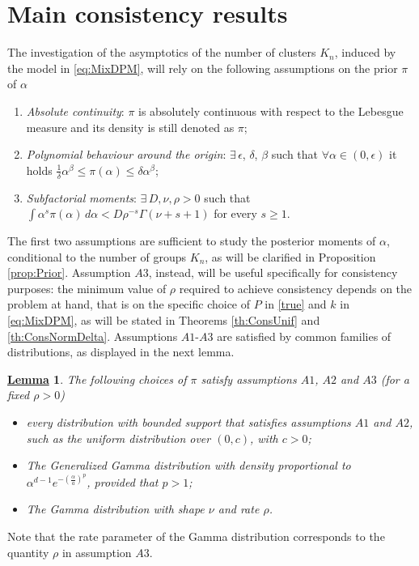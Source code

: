 \documentclass[12pt]{article}
\newtheorem{Lem}{\underline{\bf Lemma}}
\begin{document}
\section{Main consistency results}\label{sec:consistency_results}
The investigation of the asymptotics of the number of clusters $K_n$, induced by the model in \eqref{eq:MixDPM}, will rely on the following assumptions on the prior $\pi$ of $\alpha$
\begin{enumerate}
\item[$A1.$] \emph{Absolute continuity}: $\pi$ is absolutely continuous with respect to the Lebesgue measure and its density is still denoted as $\pi$;
\item[$A2.$] \emph{Polynomial behaviour around the origin}: $\exists \, \epsilon $, $\delta$, $\beta$ such that $\forall \alpha \in (0, \epsilon)$ it holds $\frac{1}{\delta}\alpha^\beta \leq \pi(\alpha) \leq \delta \alpha^\beta$;
\item[$A3.$] \emph{Subfactorial moments}: $ \exists \, D, \nu, \rho > 0$ such that $\int \alpha^s \pi(\alpha) \, d\alpha < D\rho^{-s}\Gamma(\nu+s+1)$ for every $s\ge 1$. 
\end{enumerate}
The first two assumptions are sufficient to study the posterior moments of $\alpha$, conditional to the number of groups $K_n$, as will be clarified in Proposition \ref{prop:Prior}. Assumption $A3$, instead, will be useful specifically for consistency purposes: the minimum value of $\rho$ %
required to achieve consistency depends on the problem at hand, that is on the specific choice of $P$ in \eqref{true} and $k$ in \eqref{eq:MixDPM}, as will be stated in Theorems \ref{th:ConsUnif} and \ref{th:ConsNormDelta}. Assumptions $A1$-$A3$ are satisfied by common families of distributions, as displayed in the next lemma.
\begin{Lem}\label{priors}
The following choices of $\pi$ satisfy assumptions $A1$, $A2$ and $A3$ (for a fixed $\rho > 0$)
\begin{itemize}
\item[{\rm (1)}] every distribution with bounded support that satisfies assumptions $A1$ and $A2$, such as the uniform distribution over $(0,c)$, with $c>0$;
\item[{\rm (2)}] The Generalized Gamma distribution with density proportional to $\alpha^{d-1}e^{-\left(\frac{\alpha}{a} \right)^p}$, provided that $p > 1$; 
\item[{\rm (3)}] The Gamma distribution with shape $\nu$ and rate $\rho$.
\end{itemize}
\end{Lem}
Note that the rate parameter of the Gamma distribution corresponds to the quantity $\rho$ in assumption $A3$. 
\end{document}
